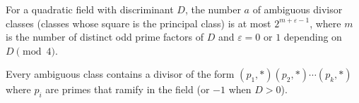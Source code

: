 For a quadratic field with discriminant $D$, the number $a$ of ambiguous divisor classes (classes whose square is the principal class) is at most $2^{m+\varepsilon-1}$, where $m$ is the number of distinct odd prime factors of $D$ and $\varepsilon = 0$ or $1$ depending on $D \pmod{4}$.

Every ambiguous class contains a divisor of the form $(p_1, *)(p_2, *) \cdots (p_k, *)$ where $p_i$ are primes that ramify in the field (or $-1$ when $D > 0$).
